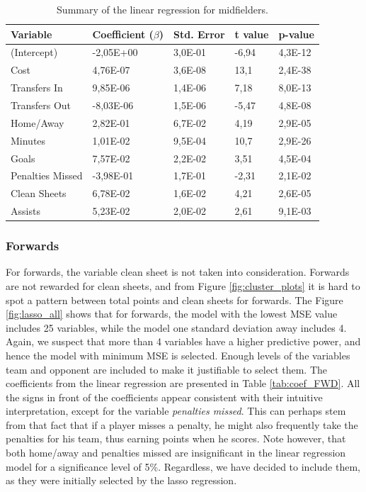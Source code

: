 \begin{table}[H]
\centering
\begin{tabular}{|l|l|l|l|l|}
\hline
Variable         & Coefficient ($\beta$)  & Std. Error & t value & p-value \\ \hline
(Intercept)      & -2,05E+00 & 3,0E-01    & -6,94   & 4,3E-12 \\
Cost             & 4,76E-07  & 3,6E-08    & 13,1   & 2,4E-38 \\
Transfers In     & 9,85E-06  & 1,4E-06    & 7,18    & 8,0E-13 \\
Transfers Out    & -8,03E-06 & 1,5E-06    & -5,47   & 4,8E-08 \\
Home/Away        & 2,82E-01  & 6,7E-02    & 4,19    & 2,9E-05 \\
Minutes          & 1,01E-02  & 9,5E-04    & 10,7   & 2,9E-26 \\
Goals            & 7,57E-02  & 2,2E-02    & 3,51    & 4,5E-04 \\
Penalties Missed & -3,98E-01 & 1,7E-01    & -2,31   & 2,1E-02 \\
Clean Sheets     & 6,78E-02  & 1,6E-02    & 4,21    & 2,6E-05 \\
Assists          & 5,23E-02  & 2,0E-02    & 2,61    & 9,1E-03 \\
\hline
\end{tabular}
\caption{Summary of the linear regression for midfielders.}
\label{tab:coef_MID}
\end{table}


\subsubsection{Forwards}
For forwards, the variable clean sheet is not taken into consideration. Forwards are not rewarded for clean sheets, and from Figure \ref{fig:cluster_plots} it is hard to spot a pattern between total points and clean sheets for forwards. The Figure \ref{fig:lasso_all} shows that for forwards, the model with the lowest MSE value includes 25 variables, while the model one standard deviation away includes 4. Again, we suspect that more than 4 variables have a higher predictive power, and hence the model with minimum MSE is selected. Enough levels of the variables team and opponent are included to make it justifiable to select them. The coefficients from the linear regression are presented in Table \ref{tab:coef_FWD}. All the signs in front of the coefficients appear consistent with their intuitive interpretation, except for the variable \textit{penalties missed}. This can perhaps stem from that fact that if a player misses a penalty, he might also frequently take the penalties for his team, thus earning points when he scores. Note however, that both home/away and penalties missed are insignificant in the linear regression model for a significance level of 5\%. Regardless, we have decided to include them, as they were initially selected by the lasso regression.

